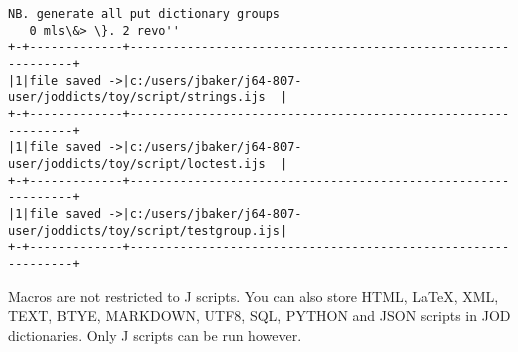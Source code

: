 \documentclass[11pt,letter,landscape]{article}
\begin{document}
    \begin{Verbatim}[commandchars=\\\{\}]
   NB. generate all put dictionary groups
   0 mls\&> \}. 2 revo'' 
+-+-------------+--------------------------------------------------------------+
|1|file saved ->|c:/users/jbaker/j64-807-user/joddicts/toy/script/strings.ijs  |
+-+-------------+--------------------------------------------------------------+
|1|file saved ->|c:/users/jbaker/j64-807-user/joddicts/toy/script/loctest.ijs  |
+-+-------------+--------------------------------------------------------------+
|1|file saved ->|c:/users/jbaker/j64-807-user/joddicts/toy/script/testgroup.ijs|
+-+-------------+--------------------------------------------------------------+

    \end{Verbatim}

    Macros are not restricted to J scripts. You can also store HTML, LaTeX,
XML, TEXT, BTYE, MARKDOWN, UTF8, SQL, PYTHON and JSON scripts in JOD
dictionaries. Only J scripts can be run however.
\end{document}
